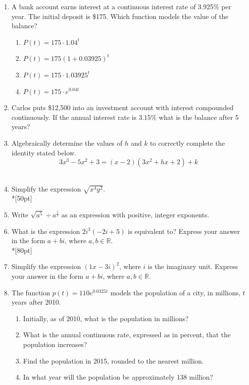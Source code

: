 \documentclass[12pt, oneside]{article}
\begin{document}
\begin{enumerate}
\newpage

\item A bank account earns interest at a continuous interest rate of 3.925\% per year. The initial deposit is \$175. Which function models the value of the balance?
\begin{enumerate}
    \item $P(t)=175 \cdot 1.04^{t}$
    \item $P(t)=175 (1+0.03925)^{t}$
    \item $P(t)=175 \cdot 1.03925^{t}$
    \item $P(t)=175 \cdot e^{0.04t}$
\end{enumerate}

\item Carlos puts \$12,500 into an investment account with interest compounded continuously. If the annual interest rate is 3.15\% what is the balance after 5 years?\\[80pt]


\item Algebraically determine the values of $h$ and $k$ to correctly complete the identity stated below.
\[3x^3-5x^2+3=(x-2)(3x^2+hx+2)+k\] \\[2in] %


\item Simplify the expression $\sqrt{x^4 y^2}$.\\*[50pt]

\item Write $\sqrt{a^5} \div a^{\frac{1}{2}}$ as an expression with positive, integer exponents.%

\newpage

\item What is the expression $2i^3(-2i+5)$ is equivalent to? Express your answer in the form $a+bi$, where $a, b \in \mathbb{R}$.\\*[80pt]  %

\item Simplify the expression $(1x - 3i)^2$, where $i$ is the imaginary unit. Express your answer in the form $a+bi$, where $a, b \in \mathbb{R}$.\\[80pt] %

\item The function $p(t)=110e^{0.0325t}$ models the population of a city, in millions, $t$ years after 2010.
\begin{enumerate}
    \item Initially, as of 2010, what is the population in millions?\\[40pt]
    \item What is the annual continuous rate, expressed as in percent, that the population increases?\\[40pt]
    \item Find the population in 2015, rounded to the nearest million.\\[80pt]
    \item In what year will the population be approximately 138 million?
\end{enumerate}


\end{enumerate}
\end{document}

